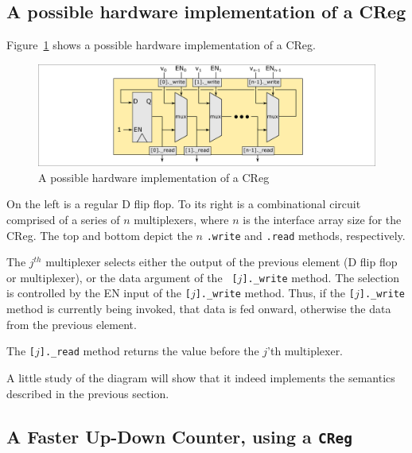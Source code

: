 
\subsection{A possible hardware implementation of a CReg}

\label{Sec_CReg_HW}

Figure~\ref{Fig_CReg_HW} shows a possible hardware implementation of a CReg.
\begin{figure}[htbp]
  \centerline{\includegraphics[width=6in,angle=0]{Figures/Fig_CReg_HW}}
  \caption{\label{Fig_CReg_HW} A possible hardware implementation of a CReg}
\end{figure}
On the left is a regular D flip flop.  To its right is a combinational
circuit comprised of a series of $n$ multiplexers, where $n$ is the
interface array size for the CReg.  The top and bottom depict the $n$
\verb|.write| and \verb|.read| methods, respectively.

The $j^{th}$ multiplexer selects either the output of the previous
element (D flip flop or multiplexer), or the data argument of the {\tt
[$j$].\_write} method.  The selection is controlled by the EN input of
the {\tt [$j$].\_write} method.  Thus, if the {\tt [$j$].\_write} method
is currently being invoked, that data is fed onward, otherwise the
data from the previous element.

The {\tt [$j$].\_read} method returns the value before the $j$'th
multiplexer.

A little study of the diagram will show that it indeed implements the
semantics described in the previous section.


\subsection{A Faster Up-Down Counter, using a {\tt CReg}}

\label{Sec_Faster_Up_Down_Counter}

